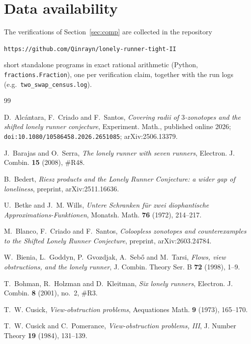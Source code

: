 \documentclass[11pt]{article}
\theoremstyle{definition}
\begin{document}
\section*{Data availability}
The verifications of Section~\ref{sec:comp} are collected in the
repository
\begin{center}
\texttt{https://github.com/Qinrayn/lonely-runner-tight-II}
\end{center}
short standalone programs in exact rational arithmetic (Python,
\texttt{fractions.Fraction}), one per verification claim, together with
the run logs (e.g.\ \texttt{two\_swap\_census.log}).

\begin{thebibliography}{99}

D.~Alc\'antara, F.~Criado and F.~Santos, \emph{Covering radii of
$3$-zonotopes and the shifted lonely runner conjecture}, Experiment.
Math., published online 2026;
\texttt{doi:10.1080/10586458.2026.2651085}; arXiv:2506.13379.

J.~Barajas and O.~Serra, \emph{The lonely runner with seven runners},
Electron. J. Combin. \textbf{15} (2008), \#R48.

B.~Bedert, \emph{Riesz products and the Lonely Runner Conjecture: a
wider gap of loneliness}, preprint, arXiv:2511.16636.

U.~Betke and J.~M. Wills, \emph{Untere Schranken f\"ur zwei diophantische
Approximations-Funktionen}, Monatsh. Math. \textbf{76} (1972), 214--217.

M.~Blanco, F.~Criado and F.~Santos, \emph{Coloopless zonotopes and
counterexamples to the Shifted Lonely Runner Conjecture}, preprint,
arXiv:2603.24784.

W.~Bienia, L.~Goddyn, P.~Gvozdjak, A.~Seb\H{o} and M.~Tarsi, \emph{Flows,
view obstructions, and the lonely runner}, J. Combin. Theory Ser. B
\textbf{72} (1998), 1--9.

T.~Bohman, R.~Holzman and D.~Kleitman, \emph{Six lonely runners},
Electron. J. Combin. \textbf{8} (2001), no.~2, \#R3.

T.~W. Cusick, \emph{View-obstruction problems}, Aequationes Math. \textbf{9}
(1973), 165--170.

T.~W. Cusick and C.~Pomerance, \emph{View-obstruction problems, III},
J. Number Theory \textbf{19} (1984), 131--139.


\end{thebibliography}
\end{document}

